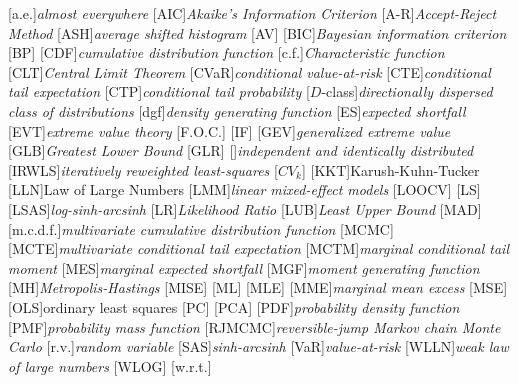 \usepackage{acronym}
[a.e.]{\textit{almost everywhere}}
[AIC]{\textit{Akaike's Information Criterion}}
[A-R]{\textit{Accept-Reject Method}}
[ASH]{\textit{average shifted histogram}}
[AV]{}
[BIC]{\textit{Bayesian information criterion}}
[BP]{}
[CDF]{\textit{cumulative distribution function}}
[c.f.]{\textit{Characteristic function}}
[CLT]{\textit{Central Limit Theorem}}
[CVaR]{\textit{conditional value-at-risk}}
[CTE]{\textit{conditional tail expectation}}
[CTP]{\textit{conditional tail probability}}
[$D$-class]{\textit{directionally dispersed class of distributions}}
[dgf]{\textit{density generating function}}
[ES]{\textit{expected shortfall}}
[EVT]{\textit{extreme value theory}}
[F.O.C.]{}
[IF]{}
[GEV]{\textit{generalized extreme value}}
[GLB]{\textit{Greatest Lower Bound}}
[GLR]{}
[]{\textit{independent and identically distributed}}
[IRWLS]{\textit{iteratively reweighted least-squares}}
[$CV_k$]{}
[KKT]{Karush-Kuhn-Tucker}
[LLN]{Law of Large Numbers}
[LMM]{\textit{linear mixed-effect models}}
[LOOCV]{}
[LS]{}
[LSAS]{\textit{log-sinh-arcsinh}}
[LR]{\textit{Likelihood Ratio}}
[LUB]{\textit{Least Upper Bound}}
[MAD]{}
[m.c.d.f.]{\textit{multivariate cumulative distribution function}}
[MCMC]{}
[MCTE]{\textit{multivariate conditional tail expectation}}
[MCTM]{\textit{marginal conditional tail moment}}
[MES]{\textit{marginal expected shortfall}}
[MGF]{\textit{moment generating function}}
[MH]{\textit{Metropolis-Hastings}}
[MISE]{}
[ML]{}
[MLE]{}
[MME]{\textit{marginal mean excess}}
[MSE]{}
[OLS]{ordinary least squares}
[PC]{}
[PCA]{}
[PDF]{\textit{probability density function}}
[PMF]{\textit{probability mass function}}
[RJMCMC]{\textit{reversible-jump Markov chain Monte Carlo}}
[r.v.]{\textit{random variable}}
[SAS]{\textit{sinh-arcsinh}}
[VaR]{\textit{value-at-risk}}
[WLLN]{\textit{weak law of large numbers}}
[WLOG]{}
[w.r.t.]{}
